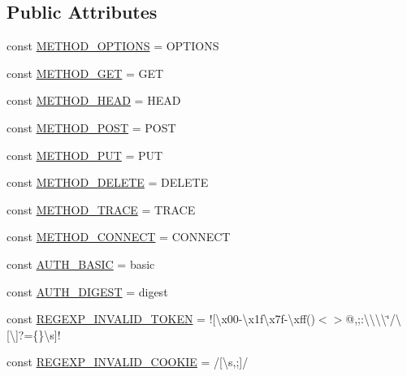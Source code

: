 \subsection*{Public Attributes}
\begin{DoxyCompactItemize}
\item 
const \hyperlink{classHTTP__Request2_a65c57cec36149d220f6cd30d43eb59b7}{M\+E\+T\+H\+O\+D\+\_\+\+O\+P\+T\+I\+O\+NS} = \textquotesingle{}O\+P\+T\+I\+O\+NS\textquotesingle{}
\item 
const \hyperlink{classHTTP__Request2_a7c1f37cc2543c9d0fe5f09086bd50b3a}{M\+E\+T\+H\+O\+D\+\_\+\+G\+ET} = \textquotesingle{}G\+ET\textquotesingle{}
\item 
const \hyperlink{classHTTP__Request2_abb68a728946a9da5f19d5bb0cf676d58}{M\+E\+T\+H\+O\+D\+\_\+\+H\+E\+AD} = \textquotesingle{}H\+E\+AD\textquotesingle{}
\item 
const \hyperlink{classHTTP__Request2_ae42a6ae396ef8abacf8e54a64a64df22}{M\+E\+T\+H\+O\+D\+\_\+\+P\+O\+ST} = \textquotesingle{}P\+O\+ST\textquotesingle{}
\item 
const \hyperlink{classHTTP__Request2_a02fd90821d762476b8ec1e226c374174}{M\+E\+T\+H\+O\+D\+\_\+\+P\+UT} = \textquotesingle{}P\+UT\textquotesingle{}
\item 
const \hyperlink{classHTTP__Request2_ab6edf309179aa4535aa6a9b12b260978}{M\+E\+T\+H\+O\+D\+\_\+\+D\+E\+L\+E\+TE} = \textquotesingle{}D\+E\+L\+E\+TE\textquotesingle{}
\item 
const \hyperlink{classHTTP__Request2_a9877a1980431a869bce427ec64c923eb}{M\+E\+T\+H\+O\+D\+\_\+\+T\+R\+A\+CE} = \textquotesingle{}T\+R\+A\+CE\textquotesingle{}
\item 
const \hyperlink{classHTTP__Request2_af03c573103c3f5bdf3ec9c3e95a08e59}{M\+E\+T\+H\+O\+D\+\_\+\+C\+O\+N\+N\+E\+CT} = \textquotesingle{}C\+O\+N\+N\+E\+CT\textquotesingle{}
\item 
const \hyperlink{classHTTP__Request2_a2282d82f67f929d936b2b2b6c2317dd1}{A\+U\+T\+H\+\_\+\+B\+A\+S\+IC} = \textquotesingle{}basic\textquotesingle{}
\item 
const \hyperlink{classHTTP__Request2_a4b05b6842e05183dc3ac3c7ff613b3c7}{A\+U\+T\+H\+\_\+\+D\+I\+G\+E\+ST} = \textquotesingle{}digest\textquotesingle{}
\item 
const \hyperlink{classHTTP__Request2_a73691a6fc7003599b47be20a8c728bbf}{R\+E\+G\+E\+X\+P\+\_\+\+I\+N\+V\+A\+L\+I\+D\+\_\+\+T\+O\+K\+EN} = \textquotesingle{}!\mbox{[}\textbackslash{}x00-\/\textbackslash{}x1f\textbackslash{}x7f-\/\textbackslash{}xff()$<$$>$@,;\+:\textbackslash{}\textbackslash{}\textbackslash{}\textbackslash{}\char`\"{}/\textbackslash{}\mbox{[}\textbackslash{}\mbox{]}?=\{\}\textbackslash{}s\mbox{]}!\textquotesingle{}
\item 
const \hyperlink{classHTTP__Request2_ab7fc574a0035ac8e940f6cd3456b0c28}{R\+E\+G\+E\+X\+P\+\_\+\+I\+N\+V\+A\+L\+I\+D\+\_\+\+C\+O\+O\+K\+IE} = \textquotesingle{}/\mbox{[}\textbackslash{}s,;\mbox{]}/\textquotesingle{}
\end{DoxyCompactItemize}
